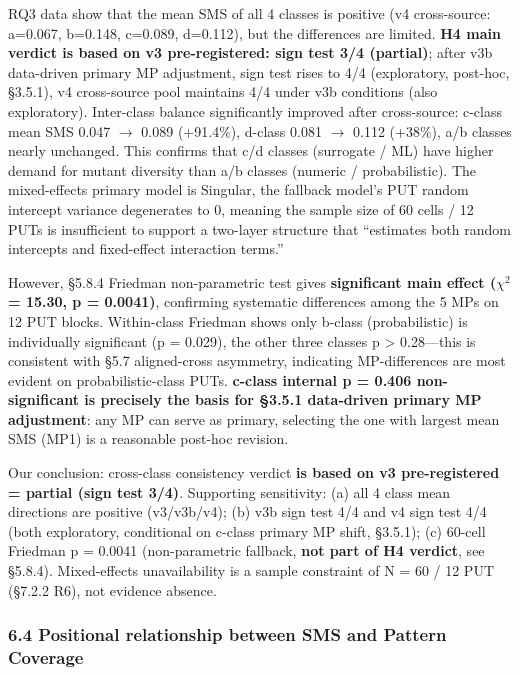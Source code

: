 \documentclass[review,12pt,authoryear]{elsarticle}
\begin{document}
RQ3 data show that the mean SMS of all 4 classes is positive (v4
cross-source: a=0.067, b=0.148, c=0.089, d=0.112), but the differences
are limited. \textbf{H4 main verdict is based on v3 pre-registered: sign
test 3/4 (partial)}; after v3b data-driven primary MP adjustment, sign
test rises to 4/4 (exploratory, post-hoc, §3.5.1), v4 cross-source pool
maintains 4/4 under v3b conditions (also exploratory). Inter-class
balance significantly improved after cross-source: c-class mean SMS
0.047 $\to$ 0.089 (+91.4\%), d-class 0.081 $\to$ 0.112 (+38\%), a/b classes
nearly unchanged. This confirms that c/d classes (surrogate / ML) have
higher demand for mutant diversity than a/b classes (numeric /
probabilistic). The mixed-effects primary model is Singular, the
fallback model's PUT random intercept variance degenerates to 0, meaning
the sample size of 60 cells / 12 PUTs is insufficient to support a
two-layer structure that ``estimates both random intercepts and
fixed-effect interaction terms.''

However, §5.8.4 Friedman non-parametric test gives \textbf{significant
main effect ($\chi$$^{2}$ = 15.30, p = 0.0041)}, confirming systematic differences
among the 5 MPs on 12 PUT blocks. Within-class Friedman shows only
b-class (probabilistic) is individually significant (p = 0.029), the
other three classes p \textgreater{} 0.28---this is consistent with §5.7
aligned-cross asymmetry, indicating MP-differences are most evident on
probabilistic-class PUTs. \textbf{c-class internal p = 0.406
non-significant is precisely the basis for §3.5.1 data-driven primary MP
adjustment}: any MP can serve as primary, selecting the one with largest
mean SMS (MP1) is a reasonable post-hoc revision.

Our conclusion: cross-class consistency verdict \textbf{is based on v3
pre-registered = partial (sign test 3/4)}. Supporting sensitivity: (a)
all 4 class mean directions are positive (v3/v3b/v4); (b) v3b sign test
4/4 and v4 sign test 4/4 (both exploratory, conditional on c-class
primary MP shift, §3.5.1); (c) 60-cell Friedman p = 0.0041
(non-parametric fallback, \textbf{not part of H4 verdict}, see §5.8.4).
Mixed-effects unavailability is a sample constraint of N = 60 / 12 PUT
(§7.2.2 R6), not evidence absence.

\subsubsection{6.4 Positional relationship between SMS and Pattern
Coverage}\label{positional-relationship-between-sms-and-pattern-coverage}
\end{document}
